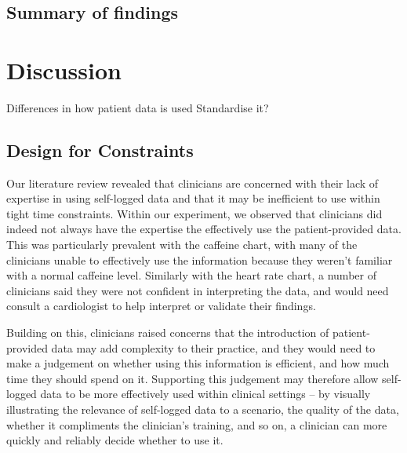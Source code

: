 \documentclass{sigchi}
\begin{document}
\subsection{Summary of findings}

\section{Discussion}





Differences in how patient data is used
Standardise it?

\subsection{Design for Constraints} %



Our literature review revealed that clinicians are concerned with their lack of expertise in using self-logged data and that it may be inefficient to use within tight time constraints. Within our experiment, we observed that clinicians did indeed not always have the expertise the effectively use the patient-provided data. This was particularly prevalent with the caffeine chart, with many of the clinicians unable to effectively use the information because they weren't familiar with a normal caffeine level. Similarly with the heart rate chart, a number of clinicians said they were not confident in interpreting the data, and would need consult a cardiologist to help interpret or validate their findings. 

Building on this, clinicians raised concerns that the introduction of patient-provided data may add complexity to their practice, and they would need to make a judgement on whether using this information is efficient, and how much time they should spend on it. Supporting this judgement may therefore allow self-logged data to be more effectively used within clinical settings -- by visually illustrating the relevance of self-logged data to a scenario, the quality of the data, whether it compliments the clinician's training, and so on, a clinician can more quickly and reliably decide whether to use it.
\end{document}
